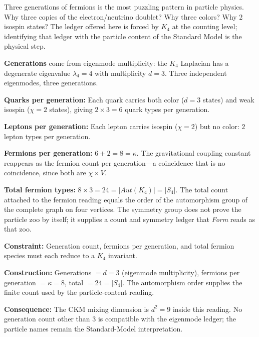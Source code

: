 \documentclass[11pt,a4paper]{book}
\def\mathrm#1{#1}%
\begin{document}
Three generations of fermions is the most puzzling pattern in particle physics. Why three copies of the electron/neutrino doublet? Why three colors? Why $2$ isospin states? The ledger offered here is forced by $K_4$ at the counting level; identifying that ledger with the particle content of the Standard Model is the physical step.

\textbf{Generations} come from eigenmode multiplicity: the $K_4$ Laplacian has a degenerate eigenvalue $\lambda_4 = 4$ with multiplicity $d = 3$. Three independent eigenmodes, three generations.

\textbf{Quarks per generation:} Each quark carries both color ($d = 3$ states) and weak isospin ($\chi = 2$ states), giving $2 \times 3 = 6$ quark types per generation.

\textbf{Leptons per generation:} Each lepton carries isospin ($\chi = 2$) but no color: $2$ lepton types per generation.

\textbf{Fermions per generation:} $6 + 2 = 8 = \kappa$. The gravitational coupling constant reappears as the fermion count per generation---a coincidence that is no coincidence, since both are $\chi \times V$.

\textbf{Total fermion types:} $8 \times 3 = 24 = |\mathrm{Aut}(K_4)| = |S_4|$. The total count attached to the fermion reading equals the order of the automorphism group of the complete graph on four vertices. The symmetry group does not prove the particle zoo by itself; it supplies a count and symmetry ledger that \textit{Form} reads as that zoo.

\textbf{Constraint:} Generation count, fermions per generation, and total fermion species must each reduce to a $K_4$ invariant.

\textbf{Construction:} Generations $= d = 3$ (eigenmode multiplicity), fermions per generation $= \kappa = 8$, total $= 24 = |S_4|$. The automorphism order supplies the finite count used by the particle-content reading.

\textbf{Consequence:} The CKM mixing dimension is $d^2 = 9$ inside this reading. No generation count other than $3$ is compatible with the eigenmode ledger; the particle names remain the Standard-Model interpretation.
\end{document}
